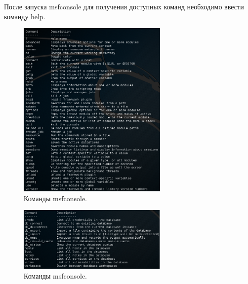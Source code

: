 \documentclass[10pt,a4paper]{article}
\begin{document}
После запуска msfconsole для получения доступных команд необходимо ввести команду help.

\begin{figure}[h!]
\begin{center}
\includegraphics[width=0.65\textwidth]{msf_help_1}
\caption{Команды msfconsole.}
\label{fig:msf_help1}
\end{center}
\end{figure}

\begin{figure}[h!]
\begin{center}
\includegraphics[width=0.65\textwidth]{msf_help_2}
\caption{Команды msfconsole.}
\label{fig:msf_help2}
\end{center}
\end{figure}
\end{document}
